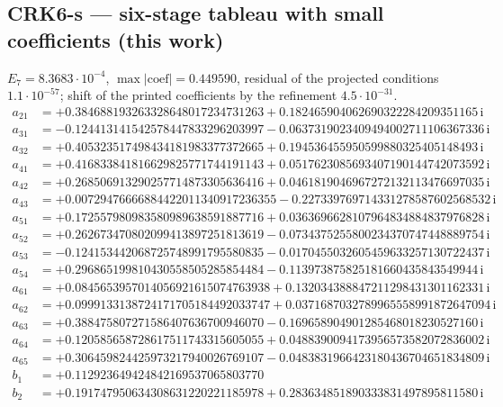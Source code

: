 \subsection*{CRK6-s --- six-stage tableau with small coefficients (this work)}
$E_{7}=8.3683\cdot10^{-4}$, $\max|\text{coef}|=0.449590$, residual of the projected conditions $1.1\cdot10^{-57}$; shift of the printed coefficients by the refinement $4.5\cdot10^{-31}$. 
{\small
\begin{align*}
a_{21} &= +0.384688193263328648017234731263 + 0.182465904062690322284209351165\,\mathrm{i}\\
a_{31} &= -0.124413141542578447833296203997 - 0.0637319023409494002711106367336\,\mathrm{i}\\
a_{32} &= +0.405323517498434181983377372665 + 0.194536455950599880325405148493\,\mathrm{i}\\
a_{41} &= +0.416833841816629825771744191143 + 0.0517623085693407190144742073592\,\mathrm{i}\\
a_{42} &= +0.268506913290257714873305636416 + 0.0461819046967272132113476697035\,\mathrm{i}\\
a_{43} &= +0.00729476666884422011340917236355 - 0.227339769714331278587602568532\,\mathrm{i}\\
a_{51} &= +0.172557980983580989638591887716 + 0.0363696628107964834884837976828\,\mathrm{i}\\
a_{52} &= +0.262673470802099413897251813619 - 0.0734375255800234370747448889754\,\mathrm{i}\\
a_{53} &= -0.124153442068725748991795580835 - 0.0170455032605459633257130722437\,\mathrm{i}\\
a_{54} &= +0.296865199810430558505285854484 - 0.113973875825181660435843549944\,\mathrm{i}\\
a_{61} &= +0.0845653957014056921615074763938 + 0.132034388847211298431301162331\,\mathrm{i}\\
a_{62} &= +0.0999133138724171705184492033747 + 0.0371687032789965558991872647094\,\mathrm{i}\\
a_{63} &= +0.388475807271586407636700946070 - 0.169658904901285468018230527160\,\mathrm{i}\\
a_{64} &= +0.120585658728617511743315605055 + 0.0488390094173956573582072836002\,\mathrm{i}\\
a_{65} &= +0.306459824425973217940026769107 - 0.0483831966423180436704651834809\,\mathrm{i}\\[1mm]
b_{1} &= +0.112923649424842169537065803770\\
b_{2} &= +0.191747950634308631220221185978 + 0.283634851890333831497895811580\,\mathrm{i}\\

\end{align*}}
